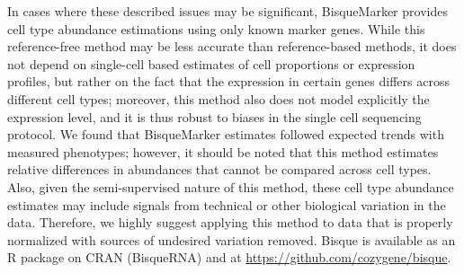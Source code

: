 In cases where these described issues may be significant, BisqueMarker provides cell type abundance estimations using only known marker genes. While this reference-free method may be less accurate than reference-based methods, it does not depend on single-cell based estimates of cell proportions or expression profiles, but rather on the fact that the expression in certain genes differs across different cell types; moreover, this method also does not model explicitly the expression level, and it is thus robust to biases in the single cell sequencing protocol. We found that BisqueMarker estimates followed expected trends with measured phenotypes; however, it should be noted that this method estimates relative differences in abundances that cannot be compared across cell types. Also, given the semi-supervised nature of this method, these cell type abundance estimates may include signals from technical or other biological variation in the data. Therefore, we highly suggest applying this method to data that is properly normalized with sources of undesired variation removed. Bisque is available as an R package on CRAN (BisqueRNA) and at \url{https://github.com/cozygene/bisque}.
